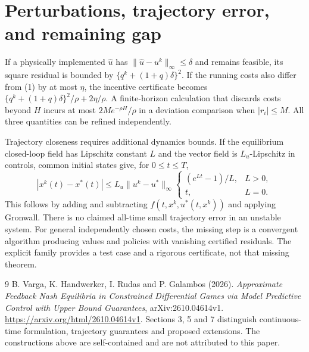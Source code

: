 \documentclass[11pt]{article}
\theoremstyle{definition}
\begin{document}
\section*{Perturbations, trajectory error, and remaining gap}
If a physically implemented $\widehat u$ has
$\|\widehat u-u^k\|_\infty\le\delta$ and remains feasible, its square residual
is bounded by $\{q^k+(1+q)\delta\}^2$. If the running costs also differ from
(1) by at most $\eta$, the incentive certificate becomes
$\{q^k+(1+q)\delta\}^2/\rho+2\eta/\rho$.
A finite-horizon calculation that discards costs beyond $H$ incurs at most
$2M e^{-\rho H}/\rho$ in a deviation comparison when $|r_i|\le M$.
All three quantities can be refined independently.

Trajectory closeness requires additional dynamics bounds. If the equilibrium
closed-loop field has Lipschitz constant $L$ and the vector field is
$L_u$-Lipschitz in controls, common initial states give, for $0\le t\le T$,
\[
 |x^k(t)-x^*(t)|\le L_u\|u^k-u^*\|_\infty
 \begin{cases}(e^{Lt}-1)/L,&L>0,\\t,&L=0.\end{cases}
\]
This follows by adding and subtracting $f(t,x^k,u^*(t,x^k))$ and applying
Gronwall. There is no claimed all-time small trajectory error in an unstable
system. For general independently chosen costs, the missing step is a
convergent algorithm producing values and policies with vanishing certified
residuals. The explicit family provides a test case and a rigorous certificate,
not that missing theorem.

\begin{thebibliography}{9}
 B. Varga, K. Handwerker, I. Rudas and P. Galambos (2026).
\emph{Approximate Feedback Nash Equilibria in Constrained Differential Games
via Model Predictive Control with Upper Bound Guarantees}, arXiv:2610.04614v1.
\url{https://arxiv.org/html/2610.04614v1}. Sections 3, 5 and 7 distinguish
continuous-time formulation, trajectory guarantees and proposed extensions.
The constructions above are self-contained and are not attributed to this paper.
\end{thebibliography}
\end{document}
